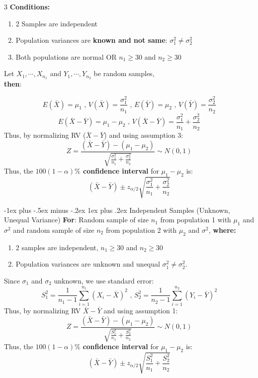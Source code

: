 \documentclass[8pt, a4paper, landscape]{article}
\makeatletter
\renewcommand{\subsubsection}{\@startsection{subsubsection}{3}{0.1mm}%
                                {-1ex plus -.5ex minus -.2ex}%
                                {1ex plus .2ex}%
                                {\normalfont\small\bfseries}}
\makeatother
\begin{document}
\begin{multicols*}{3}
\textbf{Conditions:}
\begin{enumerate}
    \item 2 Samples are independent
    \item Population variances are \textbf{known and not same}: $\sigma_1 ^2 \neq \sigma_2 ^2$
    \item Both populations are normal OR $n_1 \geq 30$ and $n_2 \geq 30$
\end{enumerate}
Let $X_1, \cdots, X_{n_1}$ and $Y_1, \cdots, Y_{n_2}$ be random samples,
\\ \textbf{then}:


\[E(\bar{X}) = \mu_1 \text{ , } V(\bar{X}) = \frac{\sigma_1 ^ 2}{n_1} \text{ , } E(\bar{Y}) = \mu_2 \text{ , } V(\bar{Y}) = \frac{\sigma_2 ^ 2}{n_2}\]
\[E(\bar{X} - \bar{Y}) = \mu_1 - \mu_2 \text{ , } V(\bar{X} - \bar{Y}) = \frac{\sigma_1^2}{n_1} + \frac{\sigma_2^2}{n_2}\]
Thus, by normalizing RV ($\bar{X} - \bar{Y}$) and using assumption 3:
\[Z = \frac{(\bar{X} - \bar{Y}) - (\mu_1 - \mu_2)}{\sqrt{\frac{\sigma_1^2}{n_1} + \frac{\sigma_2^2}{n_2}}} \sim N(0,1)\]
Thus, the \textbf{$100(1-\alpha)\%$ confidence interval} for $\mu_1 - \mu_2$ is:
\[(\bar{X} - \bar{Y}) \pm z_{\alpha/2} \sqrt{\frac{\sigma_1^2}{n_1} + \frac{\sigma_2^2}{n_2}}\]

\subsubsection{Independent Samples (Unknown, Unequal Variance)}
\textbf{For}: Random sample of size $n_1$ from population 1 with $\mu_1$ and $\sigma^2$ and random sample of size $n_2$ from population 2 with $\mu_2$ and $\sigma^2$, \textbf{where:}
\begin{enumerate}
    \item 2 samples are independent, $n_1 \geq 30$ and $n_2 \geq 30$
    \item Population variances are unknown and unequal $\sigma_1 ^2 \neq \sigma_2 ^2$.
\end{enumerate}
\smallskip
Since $\sigma_1$ and $\sigma_2$ unknown, we use standard error:
\[S_1^2 = \frac{1}{n_1 - 1} \sum _{i=1} ^{n_1} (X_i - \bar{X})^2 \text{ , } S_2^2 = \frac{1}{n_2 - 1} \sum _{i=1} ^{n_2} (Y_i - \bar{Y})^2 \]
Thus, by normalizing RV $\bar{X} - \bar{Y}$ and using assumption 1:
\[Z = \frac{(\bar{X} - \bar{Y}) - (\mu_1 - \mu_2)}{\sqrt{\frac{S_1^2}{n_1} + \frac{S_2^2}{n_2}}} \sim N(0,1)\]
Thus, the $100(1-\alpha)\%$ \textbf{confidence interval} for $\mu_1 - \mu_2$ is:
\[(\bar{X} - \bar{Y}) \pm z_{\alpha/2} \sqrt{\frac{S_1^2}{n_1} + \frac{S_2^2}{n_2}}\]



\end{multicols*}
\end{document}
